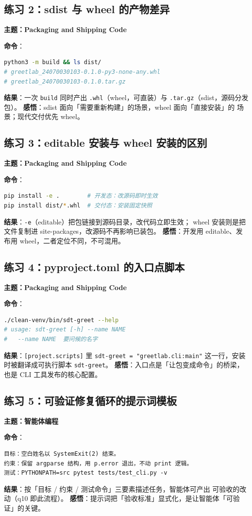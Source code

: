 \documentclass{hamesome-report}
\begin{document}
\subsection{练习 2：sdist 与 wheel 的产物差异}
\textbf{主题：Packaging and Shipping Code}\par
\textbf{命令}：
\begin{lstlisting}[language=bash]
python3 -m build && ls dist/
# greetlab_24070030103-0.1.0-py3-none-any.whl
# greetlab_24070030103-0.1.0.tar.gz
\end{lstlisting}
\textbf{结果}：一次 \texttt{build} 同时产出 \texttt{.whl}（wheel，可直装）与
\texttt{.tar.gz}（sdist，源码分发包）。
\textbf{感悟}：sdist 面向「需要重新构建」的场景，wheel 面向「直接安装」的
场景；现代交付优先 wheel。

\subsection{练习 3：editable 安装与 wheel 安装的区别}
\textbf{主题：Packaging and Shipping Code}\par
\textbf{命令}：
\begin{lstlisting}[language=bash]
pip install -e .        # 开发态：改源码即时生效
pip install dist/*.whl  # 交付态：安装固定快照
\end{lstlisting}
\textbf{结果}：\texttt{-e}（editable）把包链接到源码目录，改代码立即生效；
wheel 安装则是把文件复制进 site-packages，改源码不再影响已装包。
\textbf{感悟}：开发用 editable、发布用 wheel，二者定位不同，不可混用。

\subsection{练习 4：pyproject.toml 的入口点脚本}
\textbf{主题：Packaging and Shipping Code}\par
\textbf{命令}：
\begin{lstlisting}[language=bash]
./clean-venv/bin/sdt-greet --help
# usage: sdt-greet [-h] --name NAME
#   --name NAME  要问候的名字
\end{lstlisting}
\textbf{结果}：\texttt{[project.scripts]} 里 \texttt{sdt-greet = "greetlab.cli:main"}
这一行，安装时被翻译成可执行脚本 \texttt{sdt-greet}。
\textbf{感悟}：入口点是「让包变成命令」的桥梁，也是 CLI 工具发布的核心配置。

\subsection{练习 5：可验证修复循环的提示词模板}
\textbf{主题：智能体编程}\par
\textbf{命令}：
\begin{lstlisting}[language={}]
目标：空白姓名以 SystemExit(2) 结束。
约束：保留 argparse 结构，用 p.error 退出，不动 print 逻辑。
测试：PYTHONPATH=src pytest tests/test_cli.py -v
\end{lstlisting}
\textbf{结果}：按「目标 / 约束 / 测试命令」三要素描述任务，智能体可产出
可验收的改动（q10 即此流程）。
\textbf{感悟}：提示词把「验收标准」显式化，是让智能体「可验证」的关键。
\end{document}
